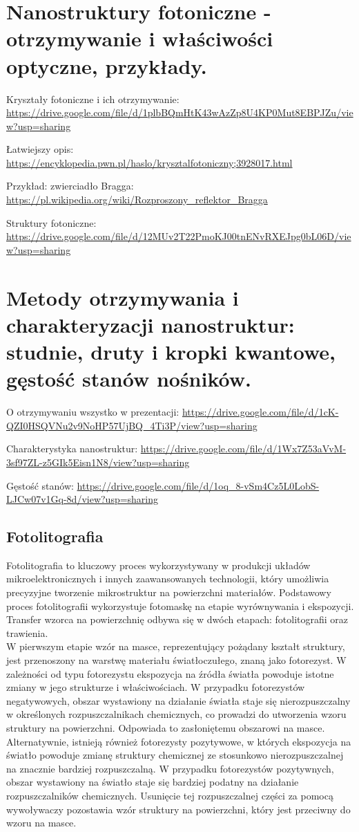 \documentclass{article}
\begin{document}
\section{Nanostruktury fotoniczne - otrzymywanie i właściwości optyczne, przykłady.}
Kryształy fotoniczne i ich otrzymywanie: \url{https://drive.google.com/file/d/1plbBQmHtK43wAzZp8U4KP0Mut8EBPJZu/view?usp=sharing}

Łatwiejszy opis: \url{https://encyklopedia.pwn.pl/haslo/krysztalfotoniczny;3928017.html}

Przykład: zwierciadło Bragga: \url{https://pl.wikipedia.org/wiki/Rozproszony_reflektor_Bragga}

Struktury fotoniczne: \url{https://drive.google.com/file/d/12MUv2T22PmoKJ00tnENvRXEJpg0bL06D/view?usp=sharing}

\section{Metody otrzymywania i charakteryzacji nanostruktur: studnie, druty i kropki
kwantowe, gęstość stanów nośników.}

O otrzymywaniu wszystko w prezentacji: \url{https://drive.google.com/file/d/1cK-QZI0HSQVNu2v9NoHP57UjBQ_4Ti3P/view?usp=sharing}

Charakterystyka nanostruktur: \url{https://drive.google.com/file/d/1Wx7Z53aVvM-3sf97ZL-z5GIk5Eisn1N8/view?usp=sharing}

Gęstość stanów: \url{https://drive.google.com/file/d/1oq_8-vSm4Cz5L0LobS-LJCw07v1Gq-8d/view?usp=sharing}

\subsection{Fotolitografia}

Fotolitografia to kluczowy proces wykorzystywany w produkcji układów mikroelektronicznych i innych zaawansowanych technologii, który umożliwia precyzyjne tworzenie mikrostruktur na powierzchni materiałów. Podstawowy proces fotolitografii wykorzystuje fotomaskę na etapie wyrównywania i ekspozycji. Transfer wzorca na powierzchnię odbywa się w dwóch etapach: fotolitografii oraz trawienia. \\

\noindent W pierwszym etapie wzór na masce, reprezentujący pożądany kształt struktury, jest przenoszony na warstwę materiału światłoczułego, znaną jako fotorezyst. W zależności od typu fotorezystu ekspozycja na źródła światła powoduje istotne zmiany w jego strukturze i właściwościach. W przypadku fotorezystów negatywowych, obszar wystawiony na działanie światła staje się nierozpuszczalny w określonych rozpuszczalnikach chemicznych, co prowadzi do utworzenia wzoru struktury na powierzchni. Odpowiada to zasłoniętemu obszarowi na masce.
Alternatywnie, istnieją również fotorezysty pozytywowe, w których ekspozycja na światło powoduje zmianę struktury chemicznej ze stosunkowo nierozpuszczalnej na znacznie bardziej rozpuszczalną. W przypadku fotorezystów pozytywnych, obszar wystawiony na światło staje się bardziej podatny na działanie rozpuszczalników chemicznych. Usunięcie tej rozpuszczalnej części za pomocą wywoływaczy pozostawia wzór struktury na powierzchni, który jest przeciwny do wzoru na masce. 
\end{document}
